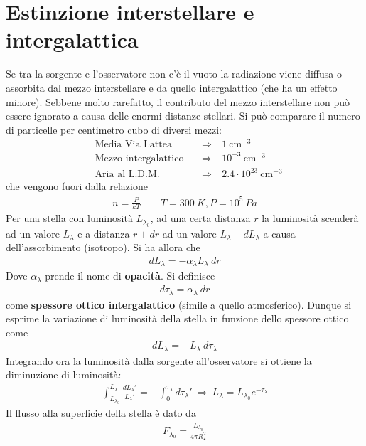 \documentclass[a4paper, oneside]{book}
\begin{document}
\section{Estinzione interstellare e intergalattica}
Se tra la sorgente e l'osservatore non c'è il vuoto la radiazione viene diffusa
o assorbita dal mezzo interstellare e da quello intergalattico (che ha un effetto minore). Sebbene
molto rarefatto, il contributo del mezzo interstellare non può essere ignorato a causa
delle enormi distanze stellari. Si può comparare il numero di particelle per centimetro cubo
di diversi mezzi:
\begin{align*}
    &\text{Media Via Lattea}& \ &\Longrightarrow \ &1 \ \text{cm}^{-3} \\
    &\text{Mezzo intergalattico}& \ &\Longrightarrow \ &10^{-3}  \ \text{cm}^{-3} \\
    &\text{Aria al L.D.M.}& \ &\Longrightarrow \ &2.4\cdot 10^{23}\ \text{cm}^{-3}
\end{align*}
che vengono fuori dalla relazione
\begin{gather*}
    n = \frac{P}{kT} \qquad T = 300 \ K, P = 10^{5} \ Pa
\end{gather*}
Per una stella con luminosità $L_{\lambda_0}$, ad una certa distanza $r$ la luminosità scenderà 
ad un valore $L_\lambda$ e a distanza $r + dr$ ad un valore $L_\lambda - dL_\lambda$ a
causa dell'assorbimento (isotropo). Si ha allora che
\begin{gather*}
    dL_\lambda = - \alpha_\lambda L_\lambda \ dr
\end{gather*}
Dove $\alpha_\lambda$ prende il nome di \textbf{opacità}. Si definisce
\begin{gather*}
    d\tau_\lambda = \alpha_\lambda \ dr
\end{gather*}
come \textbf{spessore ottico intergalattico} (simile a quello atmosferico). Dunque si esprime la variazione di luminosità della
stella in funzione dello spessore ottico come 
\begin{align}
    dL_\lambda = -L_\lambda \ d \tau_\lambda
\end{align}
Integrando ora la luminosità dalla sorgente all'osservatore si ottiene la diminuzione di luminosità:
\begin{align}
    \int_{L_{\lambda_0}}^{L_\lambda} \frac{dL_\lambda'}{L_\lambda'} = - \int_{0}^{\tau_\lambda} d \tau_\lambda ' \ \Longrightarrow \ L_\lambda = L_{\lambda_0} e^{-\tau_\lambda}  
\end{align}
Il flusso alla superficie della stella è dato da
\begin{gather*}
    F_{\lambda_0} = \frac{L_{\lambda_0}}{4\pi R_\star^{2}}
\end{gather*}
\end{document}
